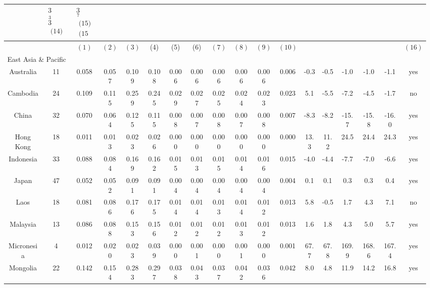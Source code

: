 \documentclass[10pt]{article}
\begin{document}
\begin{center}
\begin{tabular}{|c|c|c|c|c|c|c|c|c|c|c|c|c|c|c|c|c|c|}
{} & \multirow{2}{*}{$\begin{array}{l}3 \\
\stackrel{3}{3} \\
\text { (14) }\end{array}$} & \multirow{2}{*}{$\begin{array}{l}\underset{7}{3} \\
\text { (15) } \\
\text { (15 }\end{array}$} &  \\
\hline
 &  & $(1)$ & $(2)$ & $(3)$ & (4) & (5) & (6) & $(7)$ & $(8)$ & $(9)$ & $(10)$ &  &  &  &  &  & $(16)$ \\
\hline
\multicolumn{18}{|l|}{East Asia \& Pacific} \\
\hline
Australia & 11 & 0.058 & 0.057 & 0.109 & 0.108 & 0.006 & 0.006 & 0.006 & 0.006 & 0.006 & 0.006 & -0.3 & -0.5 & -1.0 & -1.0 & -1.1 & yes \\
\hline
Cambodia & 24 & 0.109 & 0.115 & 0.259 & 0.245 & 0.029 & 0.027 & 0.025 & 0.024 & 0.023 & 0.023 & 5.1 & -5.5 & -7.2 & -4.5 & -1.7 & no \\
\hline
China & 32 & 0.070 & 0.064 & 0.125 & 0.115 & 0.008 & 0.007 & 0.008 & 0.007 & 0.008 & 0.007 & -8.3 & -8.2 & -15.7 & -15.8 & -16.0 & yes \\
\hline
Hong Kong & 18 & 0.011 & 0.013 & 0.023 & 0.026 & 0.000 & 0.000 & 0.000 & 0.000 & 0.000 & 0.000 & 13.3 & 11.2 & 24.5 & 24.4 & 24.3 & yes \\
\hline
Indonesia & 33 & 0.088 & 0.084 & 0.169 & 0.162 & 0.015 & 0.013 & 0.015 & 0.014 & 0.016 & 0.015 & -4.0 & -4.4 & -7.7 & -7.0 & -6.6 & yes \\
\hline
Japan & 47 & 0.052 & 0.052 & 0.091 & 0.091 & 0.004 & 0.004 & 0.004 & 0.004 & 0.004 & 0.004 & 0.1 & 0.1 & 0.3 & 0.3 & 0.4 & yes \\
\hline
Laos & 18 & 0.081 & 0.086 & 0.176 & 0.175 & 0.014 & 0.014 & 0.013 & 0.014 & 0.012 & 0.013 & 5.8 & -0.5 & 1.7 & 4.3 & 7.1 & no \\
\hline
Malaysia & 13 & 0.086 & 0.088 & 0.153 & 0.156 & 0.012 & 0.012 & 0.012 & 0.013 & 0.012 & 0.013 & 1.6 & 1.8 & 4.3 & 5.0 & 5.7 & yes \\
\hline
Micronesia & 4 & 0.012 & 0.020 & 0.023 & 0.039 & 0.000 & 0.001 & 0.000 & 0.001 & 0.000 & 0.001 & 67.7 & 67.8 & 169.9 & 168.6 & 167.4 & yes \\
\hline
Mongolia & 22 & 0.142 & 0.154 & 0.283 & 0.297 & 0.038 & 0.043 & 0.037 & 0.042 & 0.036 & 0.042 & 8.0 & 4.8 & 11.9 & 14.2 & 16.8 & yes \\

\end{tabular}
\end{center}
\end{document}
